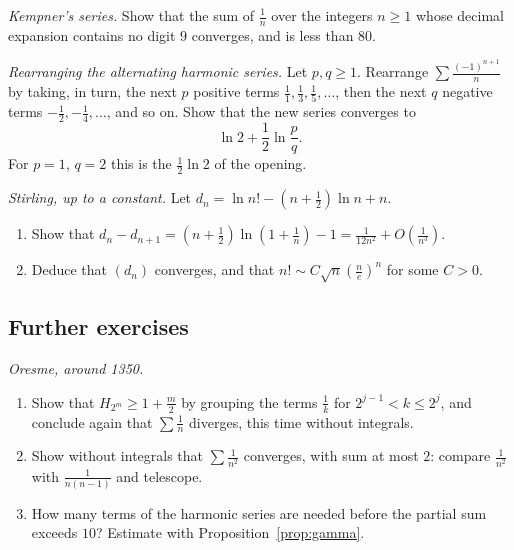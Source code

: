 \begin{exercise}[$\star\star$]\label{ex:kempner}
\emph{Kempner's series.} Show that the sum of $\frac1n$ over the integers $n\ge1$ whose decimal expansion contains no digit $9$ converges, and is less than $80$.
\end{exercise}

\begin{exercise}[$\star\star\star$]\label{ex:rearr}
\emph{Rearranging the alternating harmonic series.} Let $p,q\ge1$. Rearrange $\sum\frac{(-1)^{n+1}}n$ by taking, in turn, the next $p$ positive terms
$\frac11,\frac13,\frac15,\dots$, then the next $q$ negative terms $-\frac12,-\frac14,\dots$, and so on. Show that the new series converges to
\[
\ln2+\frac12\ln\frac pq.
\]
For $p=1$, $q=2$ this is the $\frac12\ln2$ of the opening.
\end{exercise}

\begin{exercise}[$\star\star\star$]\label{ex:stirling}
\emph{Stirling, up to a constant.} Let $d_n=\ln n!-\left(n+\frac12\right)\ln n+n$.
\begin{enumerate}[label=(\alph*)]
\item Show that $d_n-d_{n+1}=\left(n+\frac12\right)\ln\left(1+\frac1n\right)-1=\frac1{12n^2}+O\left(\frac1{n^3}\right)$.
\item Deduce that $(d_n)$ converges, and that $n!\sim C\sqrt n\left(\frac ne\right)^n$ for some $C>0$.
\end{enumerate}
\end{exercise}

\subsection*{Further exercises}

\begin{exercise}[$\star$]\label{ex:oresme}
\emph{Oresme, around 1350.}
\begin{enumerate}[label=(\alph*)]
\item Show that $H_{2^m}\ge1+\frac m2$ by grouping the terms $\frac1k$ for $2^{j-1}<k\le2^j$, and conclude again that $\sum\frac1n$ diverges, this time without integrals.
\item Show without integrals that $\sum\frac1{n^2}$ converges, with sum at most $2$: compare $\frac1{n^2}$ with $\frac1{n(n-1)}$ and telescope.
\item How many terms of the harmonic series are needed before the partial sum exceeds $10$? Estimate with Proposition~\ref{prop:gamma}.
\end{enumerate}
\end{exercise}


